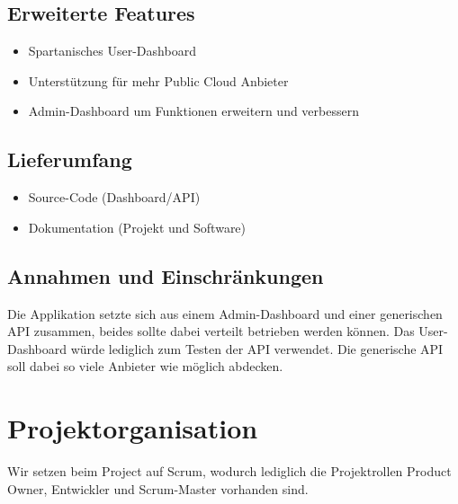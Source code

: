 \documentclass[11pt]{scrartcl}
\begin{document}
\subsection{Erweiterte Features}
\begin{itemize}
  \item Spartanisches User-Dashboard
  \item Unterstützung für mehr Public Cloud Anbieter
  \item Admin-Dashboard um Funktionen erweitern und verbessern
\end{itemize}
\subsection{Lieferumfang}
\begin{itemize}
  \item Source-Code (Dashboard/API)
  \item Dokumentation (Projekt und Software)
\end{itemize}

\subsection{Annahmen und Einschränkungen}
Die Applikation setzte sich aus einem Admin-Dashboard und einer generischen API 
zusammen, beides sollte dabei verteilt betrieben werden können.
Das User-Dashboard würde lediglich zum Testen der API verwendet.
Die generische API soll dabei so viele Anbieter wie möglich abdecken.
\section{Projektorganisation}
Wir setzen beim Project auf Scrum, wodurch lediglich die Projektrollen Product 
Owner, Entwickler und Scrum-Master vorhanden sind.
\end{document}
